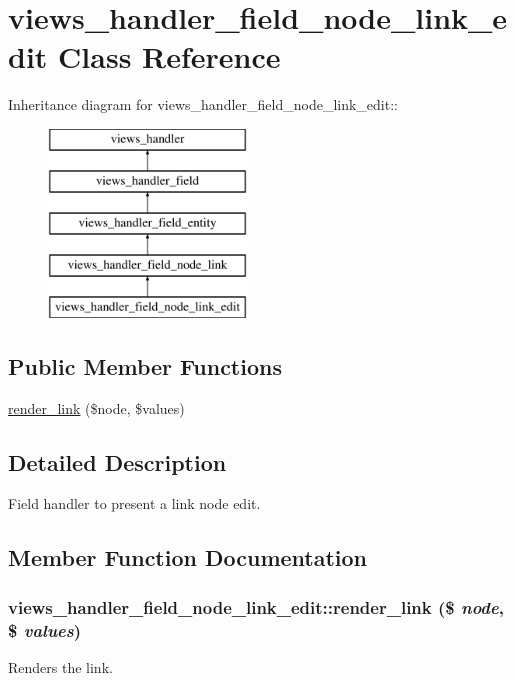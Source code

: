 \hypertarget{classviews__handler__field__node__link__edit}{
\section{views\_\-handler\_\-field\_\-node\_\-link\_\-edit Class Reference}
\label{classviews__handler__field__node__link__edit}
}
Inheritance diagram for views\_\-handler\_\-field\_\-node\_\-link\_\-edit::\begin{figure}[H]
\begin{center}
\leavevmode
\includegraphics[height=5cm]{classviews__handler__field__node__link__edit}
\end{center}
\end{figure}
\subsection*{Public Member Functions}
\begin{DoxyCompactItemize}
\item 
\hyperlink{classviews__handler__field__node__link__edit_aeb8451626c9a09d3fc312c8c8070ecdb}{render\_\-link} (\$node, \$values)
\end{DoxyCompactItemize}


\subsection{Detailed Description}
Field handler to present a link node edit. 

\subsection{Member Function Documentation}
\hypertarget{classviews__handler__field__node__link__edit_aeb8451626c9a09d3fc312c8c8070ecdb}{
\subsubsection[{render\_\-link}]{\setlength{\rightskip}{0pt plus 5cm}views\_\-handler\_\-field\_\-node\_\-link\_\-edit::render\_\-link (\$ {\em node}, \/  \$ {\em values})}}
\label{classviews__handler__field__node__link__edit_aeb8451626c9a09d3fc312c8c8070ecdb}
Renders the link. 

